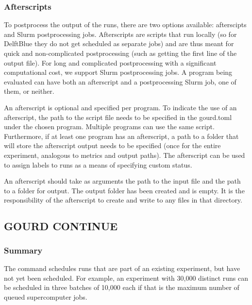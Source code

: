 \documentclass[a4paper,english]{article}
\begin{document}
\begin{adjustwidth}{18pt}{0pt}
            \subsubsection{Afterscripts}
                To postprocess the output of the runs, there are two options available: afterscipts and Slurm
                postprocessing jobs. Afterscripts are scripts that run locally (so for DelftBlue they do not
                get scheduled as separate jobs) and are thus meant for quick and non-complicated postprocessing
                (such as getting the first line of the output file). For long and complicated postprocessing
                with a significant computational cost, we support Slurm postprocessing jobs. A program being
                evaluated can have both an afterscript and a postprocessing Slurm job, one of them, or neither.

                An afterscript is optional and specified per program. To indicate the use of an afterscript,
                the path to the script file needs to be specified in the gourd.toml under the chosen program.
                Multiple programs can use the same script. Furthermore, if at least one program has an
                afterscript, a path to a folder that will store the afterscript output needs to be specified
                (once for the entire experiment, analogous to metrics and output paths). The afterscript can
                be used to assign labels to runs as a means of specifying custom status.

                An afterscript should take as arguments the path to the input file and the path to a folder
                for output. The output folder has been created and is empty. It is the responsibility of the
                afterscript to create and write to any files in that directory.

        \subsection{GOURD CONTINUE}

            \subsubsection{Summary}
                The   command schedules runs that are part of an existing
                experiment, but have not yet been scheduled.
                For example, an experiment with 30,000 distinct runs can be scheduled in three batches
                of 10,000 each if that is the maximum number of queued supercomputer jobs.


\end{adjustwidth}
\end{document}
